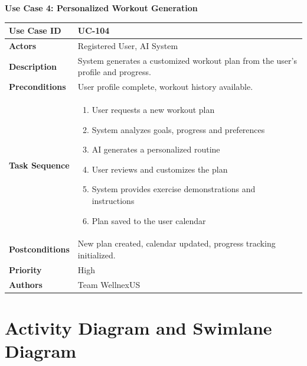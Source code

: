 \documentclass[11pt,a4paper]{report}
\newenvironment{usecase}[1]{\par\medskip\noindent\textbf{#1}\par\smallskip\small
 \begin{tabular}{|>{\bfseries}p{2.8cm}|p{11.8cm}|}\hline}{\end{tabular}\normalsize\par}
\begin{document}
\begin{usecase}{Use Case 4: Personalized Workout Generation}
Use Case ID & UC-104\\\hline
Actors & Registered User, AI System\\\hline
Description & System generates a customized workout plan from the user's profile and progress.\\\hline
Preconditions & User profile complete, workout history available.\\\hline
Task Sequence & \begin{enumerate}[nosep,leftmargin=*]
 \item User requests a new workout plan
 \item System analyzes goals, progress and preferences
 \item AI generates a personalized routine
 \item User reviews and customizes the plan
 \item System provides exercise demonstrations and instructions
 \item Plan saved to the user calendar\end{enumerate}\\\hline
Postconditions & New plan created, calendar updated, progress tracking initialized.\\\hline
Priority & High\\\hline Authors & Team WellnexUS\\\hline
\end{usecase}

\section{Activity Diagram and Swimlane Diagram}
\end{document}
